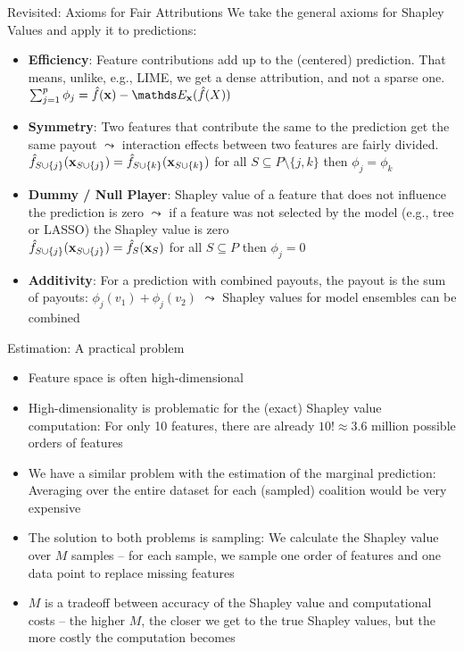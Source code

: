 \documentclass[11pt,compress,t,notes=noshow, aspectratio=169, xcolor=table]{beamer}
\begin{document}
\begin{vbframe}{Revisited: Axioms for Fair Attributions}
  We take the general axioms for Shapley Values and apply it to predictions:
  \vspace{0.25cm}
  \begin{itemize}
  \itemsep1em
    \item \textbf{Efficiency}: Feature contributions add up to the (centered) prediction. That means, unlike, e.g., LIME, we get a dense attribution, and not a sparse one.
      $\sum\nolimits_{j=1}^p\phi_j=\fh(\xv)-\E_{\xv}(\fh(X))$
    \item \textbf{Symmetry}: Two features that contribute the same to the prediction get the same payout $\leadsto$ interaction effects between two features are fairly divided. \\
      $\fh_{S\cup\{j\}}(\xv_{\Scupj}) = \fh_{\Scupk}(\xv_{\Scupk})$ for all $S \subseteq P\setminus\{j,k\}$ then $\phi_j=\phi_k$
    \item \textbf{Dummy / Null Player}: Shapley value of a feature that does not influence the prediction is zero $\leadsto$ if a feature was not selected by the model (e.g., tree or LASSO) the Shapley value is zero  \\
      $\fh_{\Scupj}(\xv_{\Scupj})=\fhS(\xv_S)$ for all $S \subseteq P$ then $\phi_j=0$
    \item \textbf{Additivity}:  For a prediction with combined payouts, the
      payout is the sum of payouts: $\phi_j(v_1) + \phi_j(v_2)$ $\leadsto$ Shapley values for model ensembles can be combined
  \end{itemize}
\end{vbframe}



\begin{vbframe}{Estimation: A practical problem}
  \begin{itemize}
  \itemsep1em
      \item Feature space is often high-dimensional
      \item High-dimensionality is problematic for the (exact) Shapley value computation: For only 10 features, there are already $10! \approx 3.6$ million possible orders of features
      \item We have a similar problem with the estimation of the marginal prediction: Averaging over the entire dataset for each (sampled) coalition would be very expensive
      \item The solution to both problems is sampling: We calculate the Shapley value over $M$ samples -- for each sample, we sample one order of features and one data point to replace missing features
      \item $M$ is a tradeoff between accuracy of the Shapley value and computational costs -- the higher $M$, the closer we get to the true Shapley values, but the more costly the computation becomes
  \end{itemize}
\end{vbframe}
\end{document}
